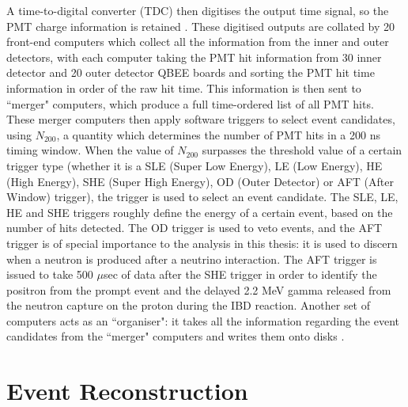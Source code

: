 A time-to-digital converter (TDC) then digitises the output time signal, so the PMT charge information is retained \cite{nishino_high-speed_2009}. These digitised outputs are collated by 20 front-end computers which collect all the information from the inner and outer detectors, with each computer taking the PMT hit information from 30 inner detector and 20 outer detector QBEE boards and sorting the PMT hit time information in order of the raw hit time. This information is then sent to ``merger" computers, which produce a full time-ordered list of all PMT hits. These merger computers then apply software triggers to select event candidates, using $N_{200}$, a quantity which determines the number of PMT hits in a 200 ns timing window. When the value of $N_{200}$ surpasses the threshold value of a certain trigger type (whether it is a SLE (Super Low Energy), LE (Low Energy), HE (High Energy), SHE (Super High Energy), OD (Outer Detector) or AFT (After Window) trigger), the trigger is used to select an event candidate. The SLE, LE, HE and SHE triggers roughly define the energy of a certain event, based on the number of hits detected. The OD trigger is used to veto events, and the AFT trigger is of special importance to the analysis in this thesis: it is used to discern when a neutron is produced after a neutrino interaction. The AFT trigger is issued to take 500 $\mu$sec of data after the SHE trigger in order to identify the positron from the prompt event and the delayed 2.2 MeV gamma released from the neutron capture on the proton during the IBD reaction. Another set of computers acts as an ``organiser": it takes all the information regarding the event candidates from the ``merger" computers and writes them onto disks \cite{fukuda_super-kamiokande_2003}.


\section{Event Reconstruction}

